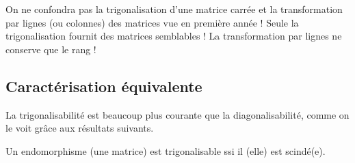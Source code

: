 \begin{rem}
On ne confondra pas la trigonalisation d'une matrice carrée et la transformation par lignes (ou colonnes) des matrices vue en première année ! Seule la trigonalisation fournit des matrices semblables ! La transformation par lignes ne conserve que le rang !
\end{rem}

\subsection{Caractérisation équivalente}

La trigonalisabilité est beaucoup plus courante que la diagonalisabilité, comme on le voit grâce aux résultats suivants.

\begin{prop}
Un endomorphisme (une matrice) est trigonalisable ssi il (elle) est scindé(e).
\end{prop}

